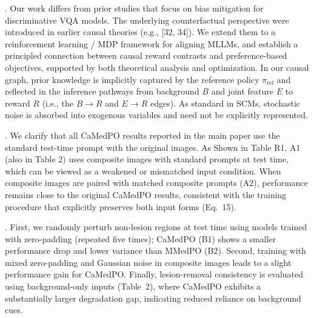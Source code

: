 \documentclass[10pt,twocolumn,letterpaper]{article}
\begin{document}
. Our work differs from prior studies that focus on bias mitigation for discriminative VQA models. The underlying counterfactual perspective were introduced in earlier causal theories (e.g., [32, 34]). We extend them to a reinforcement learning / MDP framework for aligning MLLMs, and establish a principled connection between causal reward contrasts and preference-based objectives, supported by both theoretical analysis and optimization. 
In our causal graph, prior knowledge is implicitly captured by the reference policy
$\pi_{\mathrm{ref}}$ and reflected in the inference pathways from background $B$ and
joint feature $E$ to reward $R$ (i.e., the $B\rightarrow R$ and $E\rightarrow R$ edges).
As standard in SCMs, stochastic noise is absorbed into exogenous variables and need not be explicitly represented.


. 
We clarify that all CaMedPO results reported in the main paper use the standard test-time prompt with the original images. As Shown in Table R1, A1 (also in Table 2) uses composite images with standard prompts at test time, which can be viewed as a weakened or mismatched input condition. When composite images are paired with matched composite prompts (A2), performance remains close to the original CaMedPO results, consistent with the training procedure that explicitly preserves both input forms (Eq.~15). 

. First, we randomly perturb non-lesion regions at test time using models trained with zero-padding (repeated five times); CaMedPO (B1) shows a smaller performance drop and lower variance than MMedPO (B2). Second, training with mixed zero-padding and Gaussian noise in composite images leads to a slight performance gain for CaMedPO. Finally, lesion-removal consistency is evaluated using background-only inputs (Table~2), where CaMedPO exhibits a substantially larger degradation gap, indicating reduced reliance on background cues.
\end{document}
